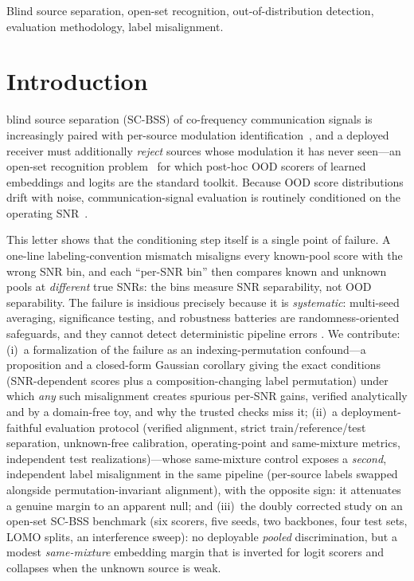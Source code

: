 \documentclass[journal,letterpaper]{IEEEtran}
\begin{document}
\begin{IEEEkeywords}
Blind source separation, open-set recognition, out-of-distribution
detection, evaluation methodology, label misalignment.
\end{IEEEkeywords}

\section{Introduction}
\label{sec:intro}

 blind source separation (SC-BSS) of
co-frequency communication signals is increasingly paired with
per-source modulation identification~\cite{hou2022single,guo2024single},
and a deployed receiver must additionally \emph{reject} sources whose
modulation it has never seen---an open-set recognition
problem~\cite{scheirer2013open,li2023expert} for which post-hoc OOD
scorers of learned embeddings and logits
\cite{hendrycks2017msp,liang2018odin,liu2020energy,lee2018mahalanobis,du2022vos}
are the standard toolkit. Because OOD score distributions drift with
noise, communication-signal evaluation is routinely conditioned on the
operating SNR~\cite{proakis2008digital,oshea2017intro,li2023expert}.

This letter shows that the conditioning step itself is a single point
of failure. A one-line labeling-convention mismatch misaligns every
known-pool score with the wrong SNR bin, and each ``per-SNR bin'' then
compares known and unknown pools at \emph{different} true SNRs: the
bins measure SNR separability, not OOD separability. The failure is insidious precisely because it is
\emph{systematic}: multi-seed averaging, significance testing, and
robustness batteries are randomness-oriented safeguards, and they
cannot detect deterministic pipeline errors
\cite{kapoor2023leakage,musgrave2020reality}. We contribute:
(i)~a formalization of the failure as an indexing-permutation
confound---a proposition and a closed-form Gaussian corollary giving
the exact conditions (SNR-dependent scores plus a composition-changing
label permutation) under which \emph{any} such misalignment creates
spurious per-SNR gains, verified analytically and by a domain-free toy,
and why the trusted checks miss it;
(ii)~a deployment-faithful evaluation protocol (verified alignment,
strict train/reference/test separation, unknown-free calibration,
operating-point and same-mixture metrics, independent test
realizations)---whose same-mixture control exposes a
\emph{second}, independent label misalignment in the same pipeline
(per-source labels swapped alongside permutation-invariant alignment),
with the opposite sign: it attenuates a genuine margin to an apparent
null; and (iii)~the doubly corrected study on an open-set SC-BSS
benchmark (six scorers, five seeds, two backbones, four test sets,
LOMO splits, an interference sweep): no deployable
\emph{pooled} discrimination, but a modest \emph{same-mixture}
embedding margin that is inverted for logit scorers and collapses when
the unknown source is weak.
\end{document}
